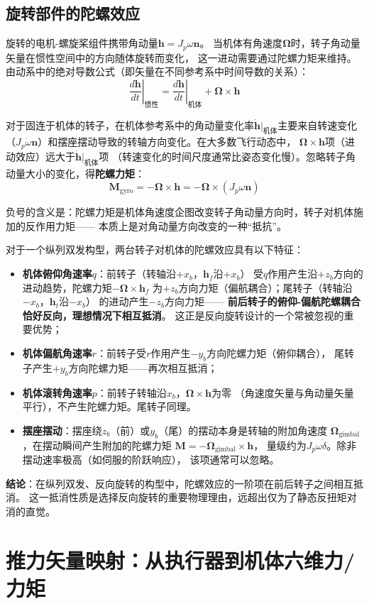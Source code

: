 \subsection{旋转部件的陀螺效应}

旋转的电机-螺旋桨组件携带角动量$\bm{h} = J_p \omega \bm{n}$。
当机体有角速度$\bm{\Omega}$时，转子角动量矢量在惯性空间中的方向随体旋转而变化，
这一进动需要通过陀螺力矩来维持。由动系中的绝对导数公式（即矢量在不同参考系中时间导数的关系）：
\begin{equation}
    \left. \frac{d\bm{h}}{dt} \right|_{\text{惯性}}
    = \left. \frac{d\bm{h}}{dt} \right|_{\text{机体}}
    + \bm{\Omega} \times \bm{h}
    \label{eq:absolute_derivative}
\end{equation}

对于固连于机体的转子，在机体参考系中的角动量变化率$\dot{\bm{h}}|_{\text{机体}}$主要来自转速变化
（$J_p \dot{\omega} \bm{n}$）和摆座摆动导致的转轴方向变化。在大多数飞行动态中，
$\bm{\Omega} \times \bm{h}$项（进动效应）远大于$\dot{\bm{h}}|_{\text{机体}}$项
（转速变化的时间尺度通常比姿态变化慢）。忽略转子角动量大小的变化，得\textbf{陀螺力矩}：
\begin{equation}
    \boxed{\bm{M}_{\text{gyro}} = -\bm{\Omega} \times \bm{h}
           = -\bm{\Omega} \times (J_p \omega \bm{n})}
    \label{eq:gyro_moment}
\end{equation}

负号的含义是：陀螺力矩是机体角速度企图改变转子角动量方向时，转子对机体施加的反作用力矩——
本质上是对角动量方向改变的一种“抵抗”。

对于一个纵列双发构型，两台转子对机体的陀螺效应具有以下特征：
\begin{itemize}
    \item \textbf{机体俯仰角速率$q$}：前转子（转轴沿$+x_b$，$\bm{h}_f$沿$+x_b$）
          受$q$作用产生沿$+z_b$方向的进动趋势，陀螺力矩$-\bm{\Omega} \times \bm{h}_f$
          为$+z_b$方向力矩（偏航耦合）；尾转子（转轴沿$-x_b$，$\bm{h}_t$沿$-x_b$）
          的进动产生$-z_b$方向力矩——
          \textbf{前后转子的俯仰-偏航陀螺耦合恰好反向，理想情况下相互抵消}。
          这正是反向旋转设计的一个常被忽视的重要优势；
    \item \textbf{机体偏航角速率$r$}：前转子受$r$作用产生$-y_b$方向陀螺力矩（俯仰耦合），
          尾转子产生$+y_b$方向陀螺力矩——再次相互抵消；
    \item \textbf{机体滚转角速率$p$}：前转子转轴沿$x_b$，$\bm{\Omega} \times \bm{h}$为零
          （角速度矢量与角动量矢量平行），不产生陀螺力矩。尾转子同理。
    \item \textbf{摆座摆动}：摆座绕$z_b$（前）或$y_b$（尾）的摆动本身是转轴的附加角速度
          $\bm{\Omega}_{\text{gimbal}}$，在摆动瞬间产生附加的陀螺力矩
          $\bm{M} = -\bm{\Omega}_{\text{gimbal}} \times \bm{h}$，
          量级约为$J_p \omega \dot{\delta}$。除非摆动速率极高（如伺服的阶跃响应），
          该项通常可以忽略。
\end{itemize}

\textbf{结论}：在纵列双发、反向旋转的构型中，陀螺效应的一阶项在前后转子之间相互抵消。
这一抵消性质是选择反向旋转的重要物理理由，远超出仅为了静态反扭矩对消的直觉。


\section{推力矢量映射：从执行器到机体六维力/力矩}
